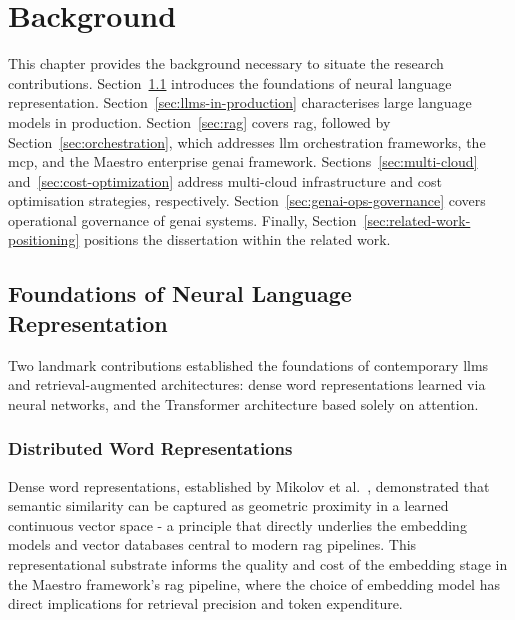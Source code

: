 
%

\chapter{Background}
\label{cha:background}

This chapter provides the background necessary to situate the research contributions. Section~\ref{sec:foundations} introduces the foundations of neural language representation. Section~\ref{sec:llms-in-production} characterises large language models in production. Section~\ref{sec:rag} covers \gls{rag}, followed by Section~\ref{sec:orchestration}, which addresses \gls{llm} orchestration frameworks, the \gls{mcp}, and the Maestro enterprise \gls{genai} framework. Sections~\ref{sec:multi-cloud} and~\ref{sec:cost-optimization} address multi-cloud infrastructure and cost optimisation strategies, respectively. Section~\ref{sec:genai-ops-governance} covers operational governance of \gls{genai} systems. Finally, Section~\ref{sec:related-work-positioning} positions the dissertation within the related work.

\section{Foundations of Neural Language Representation}
\label{sec:foundations}

Two landmark contributions established the foundations of contemporary \glspl{llm} and retrieval-augmented architectures: dense word representations learned via neural networks, and the Transformer architecture based solely on attention.

\subsection{Distributed Word Representations}
\label{sec:word2vec}

Dense word representations, established by Mikolov et al.~\cite{mikolov2013word2vec},
demonstrated that semantic similarity can be captured as geometric proximity
in a learned continuous vector space - a principle that directly underlies
the embedding models and vector databases central to modern \gls{rag} pipelines.
This representational substrate informs the quality and cost of the embedding
stage in the Maestro framework's \gls{rag} pipeline, where the choice of embedding
model has direct implications for retrieval precision and token expenditure.

